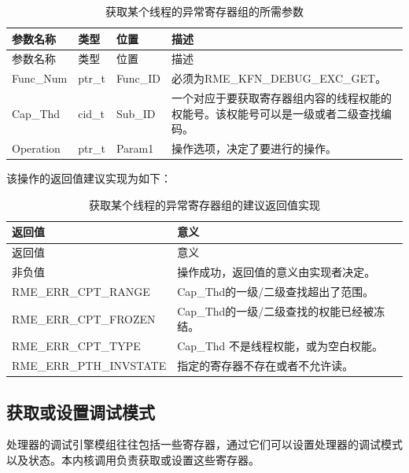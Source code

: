 \begin{xltabular}{\textwidth}{@{}>{\hsize\raggedright\arraybackslash}X>{\hsize\raggedright\arraybackslash}X>{\hsize\raggedright\arraybackslash}X>{\hsize\raggedright\arraybackslash}X@{}}
\caption{获取某个线程的异常寄存器组的所需参数}\label{tab:8-115-get-thread-exception-register-set-parameters}\\
\toprule
参数名称 & 类型 & 位置 & 描述\tabularnewline
\endfirsthead
\toprule
参数名称 & 类型 & 位置 & 描述\tabularnewline
\midrule
\endhead
\bottomrule
\endlastfoot
Func\_Num & ptr\_t & Func\_ID &
必须为RME\_KFN\_DEBUG\_EXC\_GET。\tabularnewline
Cap\_Thd & cid\_t & Sub\_ID &
一个对应于要获取寄存器组内容的线程权能的权能号。该权能号可以是一级或者二级查找编码。\tabularnewline
Operation & ptr\_t & Param1 &
操作选项，决定了要进行的操作。\tabularnewline
\end{xltabular}

该操作的返回值建议实现为如下：

\begin{xltabular}{\textwidth}{@{}>{\hsize\raggedright\arraybackslash}X>{\hsize\raggedright\arraybackslash}X@{}}
\caption{获取某个线程的异常寄存器组的建议返回值实现}\label{tab:8-116-get-thread-exception-register-set-suggested-return-values}\\
\toprule
返回值 & 意义\tabularnewline
\endfirsthead
\toprule
返回值 & 意义\tabularnewline
\midrule
\endhead
\bottomrule
\endlastfoot
    非负值 & 操作成功，返回值的意义由实现者决定。\tabularnewline
    RME\_ERR\_CPT\_RANGE & Cap\_Thd的一级/二级查找超出了范围。\tabularnewline
    RME\_ERR\_CPT\_FROZEN & Cap\_Thd的一级/二级查找的权能已经被冻结。\tabularnewline
    RME\_ERR\_CPT\_TYPE & Cap\_Thd 不是线程权能，或为空白权能。\tabularnewline
    RME\_ERR\_PTH\_INVSTATE & 指定的寄存器不存在或者不允许读。\tabularnewline
\end{xltabular}

\subsection{获取或设置调试模式}\label{subsec:8-get-or-set-debug-mode}

处理器的调试引擎模组往往包括一些寄存器，通过它们可以设置处理器的调试模式以及状态。本内核调用负责获取或设置这些寄存器。

